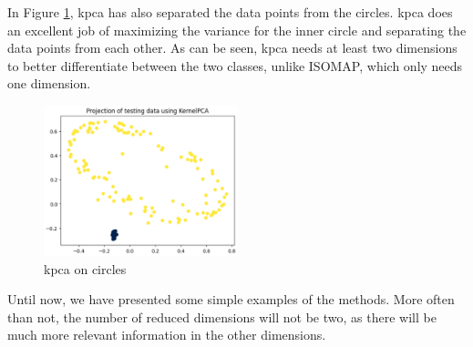 In Figure \ref{fig:circles-kernelpca}, \gls{kpca} has also separated the data points from the circles. \gls{kpca} does an excellent job of maximizing the variance for the inner circle and separating the data points from each other. As can be seen, \gls{kpca} needs at least two dimensions to better differentiate between the two classes, unlike ISOMAP, which only needs one dimension.
\begin{figure}[htb!]
    \centering
    \includegraphics[width=0.5\textwidth]{figures/theory-example-figures/circles-kernelpca.png}
    \caption{\gls{kpca} on circles}
    \label{fig:circles-kernelpca}
\end{figure}

Until now, we have presented some simple examples of the methods. More often than not, the number of reduced dimensions will not be two, as there will be much more relevant information in the other dimensions.